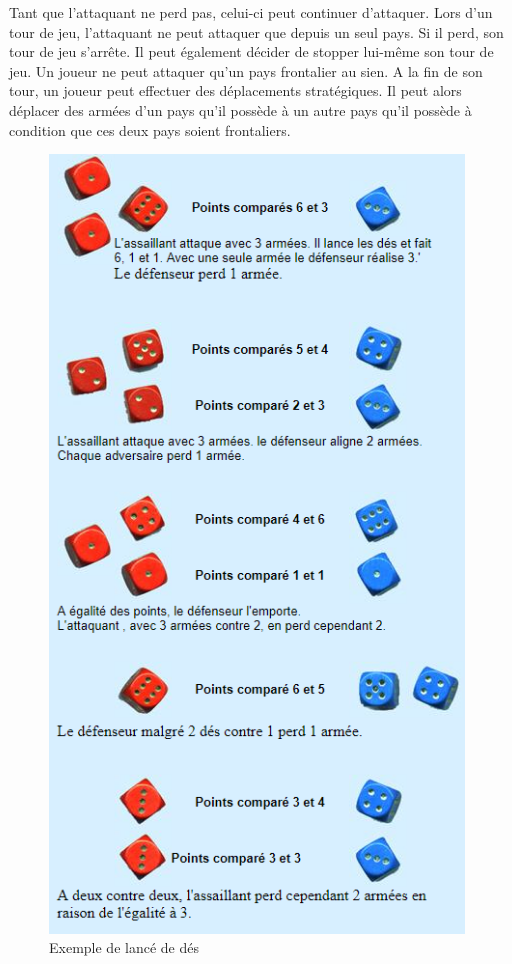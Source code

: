     Tant que l'attaquant ne perd pas, celui-ci peut continuer d'attaquer. Lors d'un tour de jeu, l'attaquant ne peut attaquer que depuis un seul pays. Si il perd, son tour de jeu s'arrête. Il peut également décider de stopper lui-même son tour de jeu. 
    \newline 
    Un joueur ne peut attaquer qu'un pays frontalier au sien. 
    \newline
    A la fin de son tour, un joueur peut effectuer des déplacements stratégiques. Il peut alors déplacer des armées d'un pays qu'il possède à un autre pays qu'il possède à condition que ces deux pays soient frontaliers.

\begin{figure}[!htbp]
        \centering
        \includegraphics[width=11cm]{Images/des_riskk.PNG}
        \caption{Exemple de lancé de dés}
    \end{figure}
\newpage 

